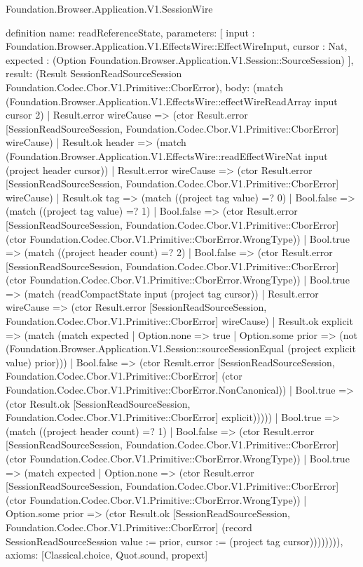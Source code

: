 \begin{lexlean}{Foundation.Browser.Application.V1.SessionWire}
\begin{semanticmodule}
definition{
  name: readReferenceState,
  parameters: [
    input : Foundation.Browser.Application.V1.EffectsWire::EffectWireInput,
    cursor : Nat,
    expected : (Option Foundation.Browser.Application.V1.Session::SourceSession)
  ],
  result: (Result SessionReadSourceSession Foundation.Codec.Cbor.V1.Primitive::CborError),
  body: (match (Foundation.Browser.Application.V1.EffectsWire::effectWireReadArray input cursor 2)
    | Result.error wireCause => (ctor Result.error [SessionReadSourceSession, Foundation.Codec.Cbor.V1.Primitive::CborError] wireCause)
    | Result.ok header => (match (Foundation.Browser.Application.V1.EffectsWire::readEffectWireNat input (project header cursor))
      | Result.error wireCause => (ctor Result.error [SessionReadSourceSession, Foundation.Codec.Cbor.V1.Primitive::CborError] wireCause)
      | Result.ok tag => (match ((project tag value) =? 0)
        | Bool.false => (match ((project tag value) =? 1)
          | Bool.false => (ctor Result.error [SessionReadSourceSession, Foundation.Codec.Cbor.V1.Primitive::CborError] (ctor Foundation.Codec.Cbor.V1.Primitive::CborError.WrongType))
          | Bool.true => (match ((project header count) =? 2)
            | Bool.false => (ctor Result.error [SessionReadSourceSession, Foundation.Codec.Cbor.V1.Primitive::CborError] (ctor Foundation.Codec.Cbor.V1.Primitive::CborError.WrongType))
            | Bool.true => (match (readCompactState input (project tag cursor))
              | Result.error wireCause => (ctor Result.error [SessionReadSourceSession, Foundation.Codec.Cbor.V1.Primitive::CborError] wireCause)
              | Result.ok explicit => (match (match expected
                  | Option.none => true
                  | Option.some prior => (not (Foundation.Browser.Application.V1.Session::sourceSessionEqual (project explicit value) prior)))
                | Bool.false => (ctor Result.error [SessionReadSourceSession, Foundation.Codec.Cbor.V1.Primitive::CborError] (ctor Foundation.Codec.Cbor.V1.Primitive::CborError.NonCanonical))
                | Bool.true => (ctor Result.ok [SessionReadSourceSession, Foundation.Codec.Cbor.V1.Primitive::CborError] explicit)))))
        | Bool.true => (match ((project header count) =? 1)
          | Bool.false => (ctor Result.error [SessionReadSourceSession, Foundation.Codec.Cbor.V1.Primitive::CborError] (ctor Foundation.Codec.Cbor.V1.Primitive::CborError.WrongType))
          | Bool.true => (match expected
            | Option.none => (ctor Result.error [SessionReadSourceSession, Foundation.Codec.Cbor.V1.Primitive::CborError] (ctor Foundation.Codec.Cbor.V1.Primitive::CborError.WrongType))
            | Option.some prior => (ctor Result.ok [SessionReadSourceSession, Foundation.Codec.Cbor.V1.Primitive::CborError] (record SessionReadSourceSession {value := prior, cursor := (project tag cursor)}))))))),
  axioms: [Classical.choice, Quot.sound, propext]
}


\end{semanticmodule}
\end{lexlean}
